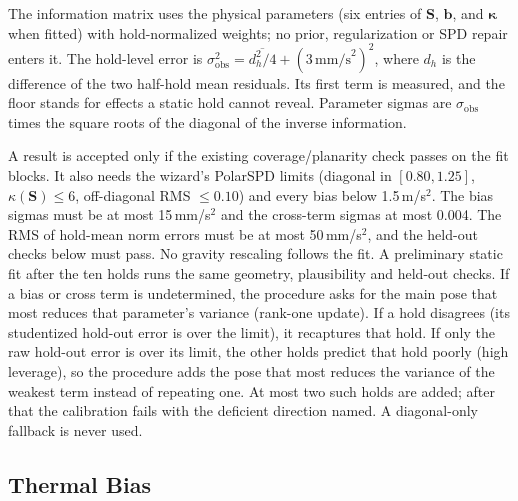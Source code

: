\documentclass[conference]{IEEEtran}
\begin{document}
    The information matrix uses the physical parameters (six entries of
    $\mathbf{S}$, $\mathbf{b}$, and $\boldsymbol\kappa$ when fitted) with
    hold-normalized weights; no prior, regularization or SPD repair enters
    it. The hold-level error is
    $\sigma_\text{obs}^2 = \overline{d_h^2/4} + (3\,\text{mm/s}^2)^2$, where
    $d_h$ is the difference of the two half-hold mean residuals. Its first
    term is measured, and the floor stands for effects a static hold cannot
    reveal. Parameter sigmas are $\sigma_\text{obs}$ times the square roots of
    the diagonal of the inverse information.

    A result is accepted only if the existing coverage/planarity check
    passes on the fit blocks. It also needs the wizard's PolarSPD limits
    (diagonal in $[0.80, 1.25]$, $\kappa(\mathbf{S})\le 6$, off-diagonal RMS
    $\le 0.10$) and every bias below 1.5\,m/s$^2$. The bias sigmas must be
    at most 15\,mm/s$^2$ and the cross-term sigmas at most 0.004. The RMS
    of hold-mean norm errors must be at most 50\,mm/s$^2$, and the held-out
    checks below must pass. No gravity rescaling follows the fit. A
    preliminary static fit after the ten holds runs the same geometry,
    plausibility and held-out checks. If a bias or cross term is
    undetermined, the procedure asks for the main pose that most reduces
    that parameter's variance (rank-one update). If a hold disagrees (its
    studentized hold-out error is over the limit), it recaptures that hold.
    If only the raw hold-out error is over its limit, the other holds
    predict that hold poorly (high leverage), so the procedure adds the pose
    that most reduces the variance of the weakest term instead of repeating
    one. At most two such holds are added; after that the
    calibration fails with the deficient direction named. A diagonal-only
    fallback is never used.

    \subsection{Thermal Bias}
    \label{sec:thermal}
\end{document}
